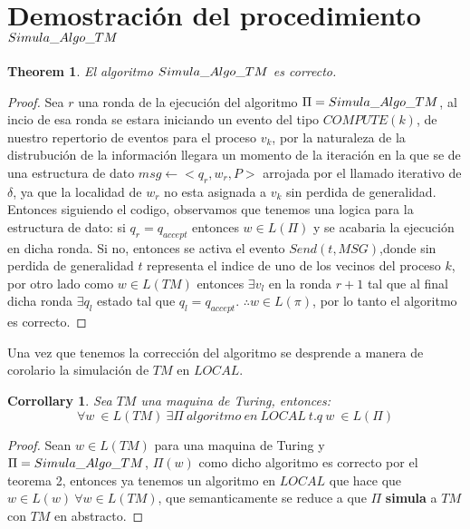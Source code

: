 \documentclass[10pt]{report}
\newtheorem{corrollary}{Corrollary}
\newtheorem{theorem}{Theorem}
\begin{document}
    \section{Demostración del procedimiento $Simula\char95Algo\char95TM$}\label{sec:demostración-del-procedimiento}
    \begin{theorem}
        El algoritmo $Simula\char95Algo\char95TM$ es correcto.
    \end{theorem}
    \begin{proof}
        Sea $r$ una ronda de la ejecución del algoritmo $\Pi=Simula\char95Algo\char95TM$,
        al incio de esa ronda se estara iniciando un evento del tipo $COMPUTE(k)$, de nuestro repertorio de eventos para el proceso
        $v_{k}$, por la naturaleza de la distrubución de la información llegara un momento
        de la iteración en la que  se de una estructura de dato $msg\gets <q_{r},w_{r},P>$ arrojada por el llamado iterativo de
        $\delta$, ya que la localidad de $w_{r}$ no esta asignada a $v_{k}$ sin perdida de generalidad.
        Entonces siguiendo el codigo, observamos que tenemos una logica para la estructura de dato:
        si $q_{r}=q_{accept}$ entonces $w\in L(\Pi)$ y se acabaria la ejecución en dicha ronda.
        Si no, entonces se activa el evento $Send(t,MSG)$,donde sin perdida de generalidad $t$ representa el indice de uno de los vecinos
        del proceso $k$, por otro lado como $w\in L(TM)$ entonces $\exists v_{l}$ en la ronda $r+1$
        tal que al final dicha ronda $\exists q_{l}$ estado tal que $q_{l} = q_{accept}$.\newline
        $\therefore w\in L(\pi)$, por lo tanto el algoritmo es correcto.

    \end{proof}
    Una vez que tenemos la corrección del algoritmo se desprende a manera de corolario la
    simulación de $TM$ en $LOCAL$.
    \begin{corrollary}
        Sea $TM$ una maquina de Turing, entonces:
        \begin{equation}
            \forall w \  \in L(TM) \ \exists \Pi \ algoritmo \ en \ LOCAL\ t.q \ w \ \in L(\Pi)
        \end{equation}
    \end{corrollary}

    \begin{proof}
        Sean $w\in L(TM)$ para una maquina de Turing y  $\Pi =Simula\char95Algo\char95TM$, $\Pi(w)$ como dicho algoritmo es correcto por el teorema 2,
        entonces ya tenemos un algoritmo  en $LOCAL$ que hace  que $w\in L(w) \ \forall w\in L(TM)$,
        que semanticamente se reduce a que $\Pi$ \textbf{simula} a $TM$ con $TM$ en abstracto.
    \end{proof}
\end{document}
